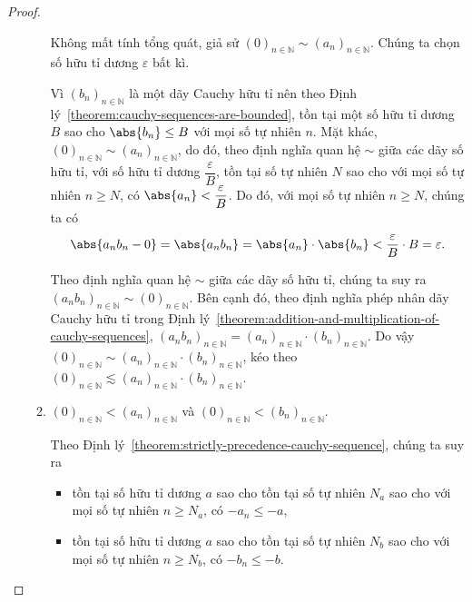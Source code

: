 \begin{proof}
\begin{enumerate}[label={(\roman*)}]
\begin{enumerate}[label={\textbf{Trường hợp \arabic*.}},itemindent=1cm]
                        Không mất tính tổng quát, giả sử ${(0)}_{n\in\mathbb{N}}\sim {(a_{n})}_{n\in\mathbb{N}}$. Chúng ta chọn số hữu tỉ dương $\varepsilon$ bất kì.

                        Vì ${(b_{n})}_{n\in\mathbb{N}}$ là một dãy Cauchy hữu tỉ nên theo Định lý~\ref{theorem:cauchy-sequences-are-bounded}, tồn tại một số hữu tỉ dương $B$ sao cho $\abs{b_{n}}\leq B$ với mọi số tự nhiên $n$. Mặt khác, ${(0)}_{n\in\mathbb{N}}\sim {(a_{n})}_{n\in\mathbb{N}}$, do đó, theo định nghĩa quan hệ $\sim$ giữa các dãy số hữu tỉ, với số hữu tỉ dương $\dfrac{\varepsilon}{B}$, tồn tại số tự nhiên $N$ sao cho với mọi số tự nhiên $n\geq N$, có $\abs{a_{n}} < \dfrac{\varepsilon}{B}$. Do đó, với mọi số tự nhiên $n\geq N$, chúng ta có
                        \[
                            \abs{a_{n}b_{n} - 0} = \abs{a_{n}b_{n}} = \abs{a_{n}}\cdot\abs{b_{n}} < \dfrac{\varepsilon}{B}\cdot B = \varepsilon.
                        \]

                        Theo định nghĩa quan hệ $\sim$ giữa các dãy số hữu tỉ, chúng ta suy ra ${(a_{n}b_{n})}_{n\in\mathbb{N}}\sim {(0)}_{n\in\mathbb{N}}$. Bên cạnh đó, theo định nghĩa phép nhân dãy Cauchy hữu tỉ trong Định lý~\ref{theorem:addition-and-multiplication-of-cauchy-sequences}, ${(a_{n}b_{n})}_{n\in\mathbb{N}} = {(a_{n})}_{n\in\mathbb{N}}\cdot {(b_{n})}_{n\in\mathbb{N}}$. Do vậy ${(0)}_{n\in\mathbb{N}}\sim {(a_{n})}_{n\in\mathbb{N}}\cdot {(b_{n})}_{n\in\mathbb{N}}$, kéo theo ${(0)}_{n\in\mathbb{N}}\lesssim {(a_{n})}_{n\in\mathbb{N}}\cdot {(b_{n})}_{n\in\mathbb{N}}$.
                  \item ${(0)}_{n\in\mathbb{N}} < {(a_{n})}_{n\in\mathbb{N}}$ và ${(0)}_{n\in\mathbb{N}} < {(b_{n})}_{n\in\mathbb{N}}$.

                        Theo Định lý~\ref{theorem:strictly-precedence-cauchy-sequence}, chúng ta suy ra
                        \begin{itemize}
                            \item tồn tại số hữu tỉ dương $a$ sao cho tồn tại số tự nhiên $N_{a}$ sao cho với mọi số tự nhiên $n\geq N_{a}$, có $-a_{n}\leq -a$,
                            \item tồn tại số hữu tỉ dương $a$ sao cho tồn tại số tự nhiên $N_{b}$ sao cho với mọi số tự nhiên $n\geq N_{b}$, có $-b_{n}\leq -b$.
                        \end{itemize}


\end{enumerate}
\end{enumerate}
\end{proof}
